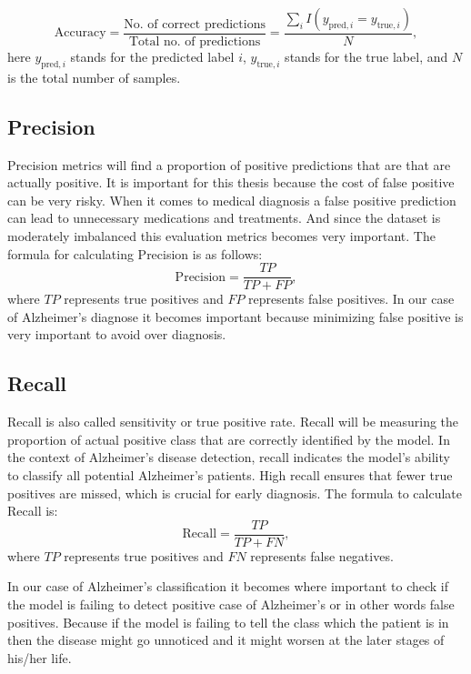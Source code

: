 \documentclass[12pt,onecolumn]{report}
\begin{document}
\begin{equation}
    \text{Accuracy} = \frac{\text{No. of correct predictions}}{\text{Total no. of predictions}} = \frac{\sum_{i} I(y_{\text{pred},i} = y_{\text{true},i})}{N},
\end{equation}
here \( y_{\text{pred},i} \) stands for the predicted label \( i \), \( y_{\text{true},i} \) stands for the true label, and \( N \) is the total number of samples.

\subsection{Precision}
Precision metrics will find a proportion of positive predictions that are that are actually positive. It is important for this thesis because the cost of false positive can be very risky. When it comes to medical diagnosis a false positive prediction can lead to unnecessary medications and treatments. And since the dataset is moderately imbalanced this evaluation metrics becomes very important. The formula for calculating Precision is as follows:
\begin{equation}
    \text{Precision} = \frac{TP}{TP + FP},
\end{equation}
where \( TP \) represents true positives and \( FP \) represents false positives.
In our case of Alzheimer’s diagnose it becomes important because minimizing false positive is very important to avoid over diagnosis.

\subsection{Recall}
Recall is also called sensitivity or true positive rate. Recall will be measuring the proportion of actual positive class that are correctly identified by the model. In the context of Alzheimer's disease detection, recall indicates the model’s ability to classify all potential Alzheimer’s patients. High recall ensures that fewer true positives are missed, which is crucial for early diagnosis. The formula to calculate Recall is:
\begin{equation}
    \text{Recall} = \frac{TP}{TP + FN},
\end{equation}
where \( TP \) represents true positives and \( FN \) represents false negatives.

In our case of Alzheimer’s classification it becomes where important to check if the model is failing to detect positive case of Alzheimer’s or in other words false positives. Because if the model is failing to tell the class which the patient is in then the disease might go unnoticed and it might worsen at the later stages of his/her life.
\end{document}
